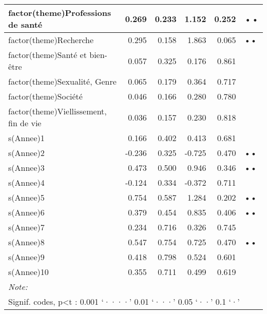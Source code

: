 \documentclass[
  letterpaper,
  DIV=11,
  numbers=noendperiod]{scrartcl}
\begin{document}
\begin{table}
\begin{minipage}[t]{\linewidth}
{\begin{tabular}[t]{l|r|r|r|r|l}
\hline
factor(theme)Professions de santé & 0.269 & 0.233 & 1.152 & 0.252 & ••\\
\hline
factor(theme)Recherche & 0.295 & 0.158 & 1.863 & 0.065 & ••\\
\hline
factor(theme)Santé et bien-être & 0.057 & 0.325 & 0.176 & 0.861 & \\
\hline
factor(theme)Sexualité, Genre & 0.065 & 0.179 & 0.364 & 0.717 & \\
\hline
factor(theme)Société & 0.046 & 0.166 & 0.280 & 0.780 & \\
\hline
factor(theme)Viellissement, fin de vie & 0.036 & 0.157 & 0.230 & 0.818 & \\
\hline
s(Annee)1 & 0.166 & 0.402 & 0.413 & 0.681 & \\
\hline
s(Annee)2 & -0.236 & 0.325 & -0.725 & 0.470 & ••\\
\hline
s(Annee)3 & 0.473 & 0.500 & 0.946 & 0.346 & ••\\
\hline
s(Annee)4 & -0.124 & 0.334 & -0.372 & 0.711 & \\
\hline
s(Annee)5 & 0.754 & 0.587 & 1.284 & 0.202 & ••\\
\hline
s(Annee)6 & 0.379 & 0.454 & 0.835 & 0.406 & ••\\
\hline
s(Annee)7 & 0.234 & 0.716 & 0.326 & 0.745 & \\
\hline
s(Annee)8 & 0.547 & 0.754 & 0.725 & 0.470 & ••\\
\hline
s(Annee)9 & 0.418 & 0.798 & 0.524 & 0.601 & \\
\hline
s(Annee)10 & 0.355 & 0.711 & 0.499 & 0.619 & \\
\hline
\multicolumn{6}{l}{\rule{0pt}{1em}\textit{Note: }}\\
\multicolumn{6}{l}{\rule{0pt}{1em}Signif. codes, p<t : 0.001 ‘····’ 0.01 ‘···’ 0.05 ‘··’ 0.1 ‘·’ }\\
\end{tabular}

}

\end{minipage}%
\newline
\begin{minipage}[t]{\linewidth}

{\centering 

}
\end{minipage}
\end{table}
\end{document}
